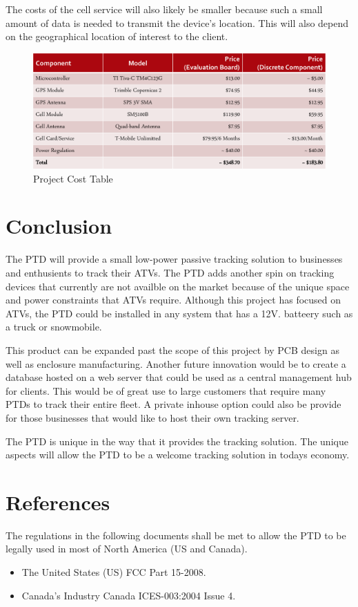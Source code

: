 \documentclass[11pt]{article}
\begin{document}
The costs of the cell service will also likely be smaller because such a small amount of data is needed to transmit the device's location. This will 
also depend on the geographical location of interest to the client.
\begin{figure}[H]
   \centering
       \includegraphics[scale=0.4]{cost_table.png}
   \caption{Project Cost Table}
   \label{tab:cost}
\end{figure}


\section{Conclusion}
The PTD will provide a small low-power passive tracking solution to businesses and enthusients to track their ATVs. The PTD adds another spin on tracking 
devices that currently are not availble on the market because of the unique space and power constraints that ATVs require. Although this project has focused 
on ATVs, the PTD could be installed in any system that has a 12V. batteery such as a truck or snowmobile. 

This product can be expanded past the scope of this project by PCB design as well as enclosure manufacturing. Another future innovation would be to create 
a database hosted on a web server that could be used as a central management hub for clients. This would be of great use to large customers that require 
many PTDs to track their entire fleet. A private inhouse option could also be provide for those businesses that would like to host their own tracking server.

The PTD is unique in the way that it provides the tracking solution. The unique aspects will allow the PTD to be a welcome tracking solution in todays 
economy.


\section{References}
The regulations in the following documents shall be met to allow the PTD to be legally used in most of North America (US and Canada).
\begin{itemize}
    \item The United States (US) FCC Part 15-2008.
    \item Canada's Industry Canada ICES-003:2004 Issue 4.
\end{itemize}
\end{document}
